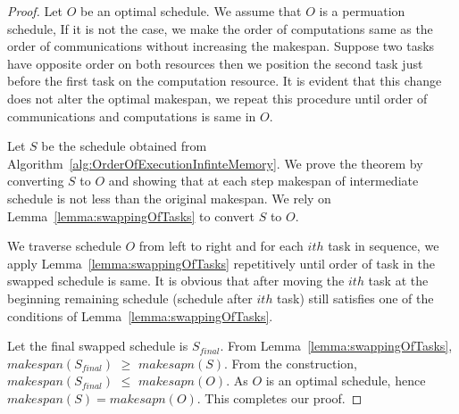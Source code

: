 \documentclass[sigconf]{acmart}
\begin{document}
	\begin{proof}
		
		Let $O$ be an optimal schedule. We assume that $O$ is a permuation schedule, If it is not the case, we make the order of computations same as the order of communications without increasing the makespan.  Suppose two tasks have opposite order on both resources then we position the second task just before the first task on the computation resource. It is evident that this change does not alter the optimal  makespan, we repeat this procedure until order of communications and computations is same in $O$.
		
		Let $S$ be the  schedule obtained from Algorithm~\ref{alg:OrderOfExecutionInfinteMemory}. We prove the theorem by converting $S$ to $O$ and showing that at each step makespan of intermediate schedule is not less than the original makespan. We rely on Lemma~\ref{lemma:swappingOfTasks} to convert $S$ to $O$.
		
		We traverse schedule $O$ from left to right and for each $ith$ task in sequence, we apply Lemma~\ref{lemma:swappingOfTasks} repetitively until order of task in the swapped schedule is same. It is obvious that after moving the $ith$ task at the beginning remaining schedule (schedule after $ith$ task) still satisfies one of the conditions of Lemma~\ref{lemma:swappingOfTasks}.
		
		Let the final swapped schedule is $S_{final}$. From Lemma~\ref{lemma:swappingOfTasks}, $makespan(S_{final})$ $ \ge $ $makesapn(S)$. From the construction, $makespan(S_{final})$ $ \le$ $ makesapn(O)$. As $O$ is an optimal schedule, hence $makespan(S) = makesapn(O)$. This completes our proof.
	\end{proof}
	
	
\end{document}
